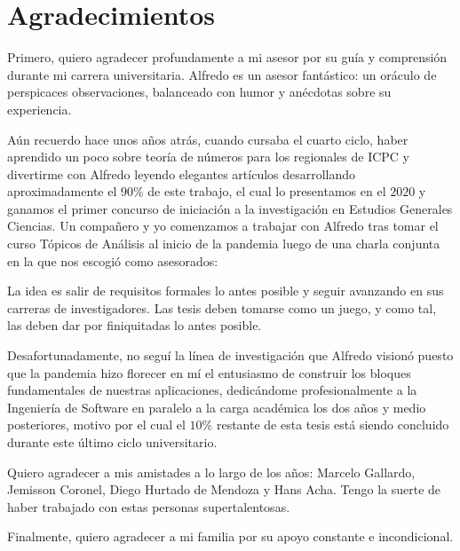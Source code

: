 \chapter*{Agradecimientos}
\thispagestyle{empty}

\vspace{-0.5cm}

Primero, quiero agradecer profundamente a mi asesor
por su guía y comprensión durante mi carrera universitaria.
Alfredo es un asesor fantástico:
un oráculo de perspicaces observaciones,
balanceado con humor
y anécdotas sobre su experiencia.

Aún recuerdo hace unos años atrás,
cuando cursaba el cuarto ciclo,
haber aprendido un poco sobre teoría de números
para los regionales de ICPC
y divertirme con Alfredo
leyendo elegantes artículos
desarrollando aproximadamente el \(90\%\) de este trabajo,
el cual lo presentamos en el \(2020\) y ganamos el
primer concurso de iniciación a la investigación en Estudios Generales Ciencias.
Un compa\~nero y yo comenzamos a trabajar con Alfredo
tras tomar el curso Tópicos de Análisis al inicio de la pandemia
luego de una charla conjunta en la que nos escogió como asesorados:

\begin{displayquote}
La idea es salir de requisitos formales lo antes posible
y seguir avanzando en sus carreras de investigadores.
Las tesis deben tomarse como un juego,
y como tal,
las deben dar por finiquitadas lo antes posible.
\end{displayquote}

Desafortunadamente,
no seguí la línea de investigación
que Alfredo visionó
puesto que la pandemia
hizo florecer en mí
el entusiasmo de construir
los bloques fundamentales de nuestras aplicaciones,
dedicándome profesionalmente
a la Ingeniería de Software
en paralelo a la carga académica
los dos años y medio posteriores,
motivo por el cual el \(10\%\) restante de esta tesis
está siendo concluido durante este \'ultimo ciclo universitario.

Quiero agradecer a mis amistades a lo largo de los años:
Marcelo Gallardo,
Jemisson Coronel,
Diego Hurtado de Mendoza
y
Hans Acha.
Tengo la suerte de haber trabajado con estas personas supertalentosas.

Finalmente, quiero agradecer a mi familia por su apoyo constante e incondicional.
